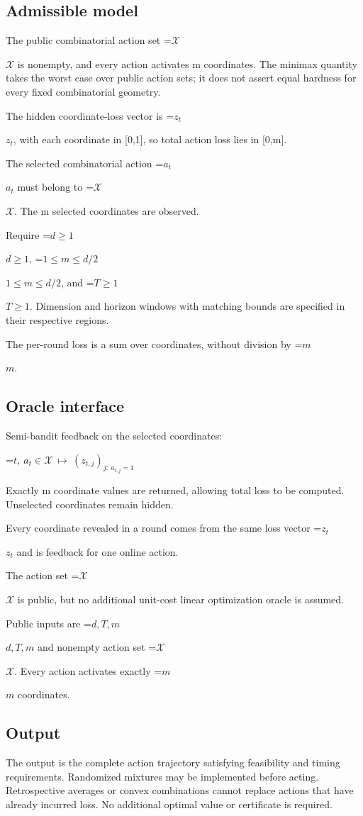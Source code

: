 \documentclass[10pt,a4paper]{article}
\newcommand{\AtlasMath}[1]{\par\begingroup\centering\setbox0=\hbox{$\displaystyle #1$}\ifdim\wd0>1.4\linewidth\typeout{ATLAS WIDE FORMULA: \the\wd0}\fi\ifdim\wd0>\linewidth\resizebox{\linewidth}{!}{\box0}\else\box0\fi\par\endgroup}
\newcommand{\AtlasInlineMath}[1]{\begingroup\setbox0=\hbox{$#1$}\ifdim\wd0>.4\linewidth\endgroup\AtlasMath{#1}\else\endgroup$#1$\fi}
\begin{document}
\subsection{Admissible model}
The public combinatorial action set \AtlasInlineMath{\mathcal{X}} is nonempty, and every action activates m coordinates. The minimax quantity takes the worst case over public action sets; it does not assert equal hardness for every fixed combinatorial geometry.

The hidden coordinate-loss vector is \AtlasInlineMath{z_t}, with each coordinate in [0,1], so total action loss lies in [0,m].

The selected combinatorial action \AtlasInlineMath{a_t} must belong to \AtlasInlineMath{\mathcal{X}}. The m selected coordinates are observed.

Require \AtlasInlineMath{d\ge1}, \AtlasInlineMath{1\le m\le d/2}, and \AtlasInlineMath{T\ge1}. Dimension and horizon windows with matching bounds are specified in their respective regions.

The per-round loss is a sum over coordinates, without division by \AtlasInlineMath{m}.

\subsection{Oracle interface}
Semi-bandit feedback on the selected coordinates:


\AtlasMath{t,\ a_t\in\mathcal{X}\ \longmapsto\ (z_{t,j})_{j:\ a_{t,j}=1}}


Exactly m coordinate values are returned, allowing total loss to be computed. Unselected coordinates remain hidden.

Every coordinate revealed in a round comes from the same loss vector \AtlasInlineMath{z_t} and is feedback for one online action.

The action set \AtlasInlineMath{\mathcal X} is public, but no additional unit-cost linear optimization oracle is assumed.

Public inputs are \AtlasInlineMath{d,T,m} and nonempty action set \AtlasInlineMath{\mathcal X}. Every action activates exactly \AtlasInlineMath{m} coordinates.

\subsection{Output}
The output is the complete action trajectory satisfying feasibility and timing requirements. Randomized mixtures may be implemented before acting. Retrospective averages or convex combinations cannot replace actions that have already incurred loss. No additional optimal value or certificate is required.
\end{document}
